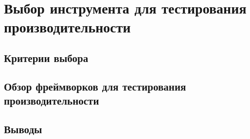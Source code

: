 \chapter{Выбор инструмента для тестирования производительности}
\section{Критерии выбора}
\section{Обзор фреймворков для тестирования производительности}
\section{Выводы}